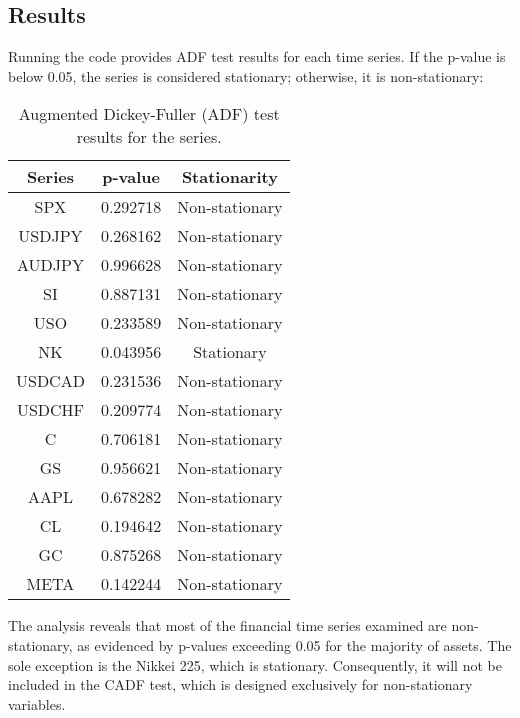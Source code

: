 \documentclass{article}
\begin{document}
\subsection*{Results}
Running the code provides ADF test results for each time series. If the p-value is below 0.05, the series is considered stationary; otherwise, it is non-stationary:
\begin{table}[h]
    \centering
    \begin{tabular}{|c|c|c|}
        \hline
        \textbf{Series} & \textbf{p-value} & \textbf{Stationarity} \\
        \hline
        SPX & 0.292718 & Non-stationary \\
        \hline
        USDJPY & 0.268162 & Non-stationary \\
        \hline
        AUDJPY & 0.996628 & Non-stationary \\
        \hline
        SI & 0.887131 & Non-stationary \\
        \hline
        USO & 0.233589 & Non-stationary \\
        \hline
        NK & 0.043956 & Stationary \\
        \hline
        USDCAD & 0.231536 & Non-stationary \\
        \hline
        USDCHF & 0.209774 & Non-stationary \\
        \hline
        C & 0.706181 & Non-stationary \\
        \hline
        GS & 0.956621 & Non-stationary \\
        \hline
        AAPL & 0.678282 & Non-stationary \\
        \hline
        CL & 0.194642 & Non-stationary \\
        \hline
        GC & 0.875268 & Non-stationary \\
        \hline
        META & 0.142244 & Non-stationary \\
        \hline
    \end{tabular}
    \caption{Augmented Dickey-Fuller (ADF) test results for the series.}
    \label{tab:ADF_results}
\end{table}
The analysis reveals that most of the financial time series examined are non-stationary, as evidenced by p-values exceeding 0.05 for the majority of assets. The sole exception is the Nikkei 225, which is stationary. Consequently, it will not be included in the CADF test, which is designed exclusively for non-stationary variables.
\clearpage
\end{document}
